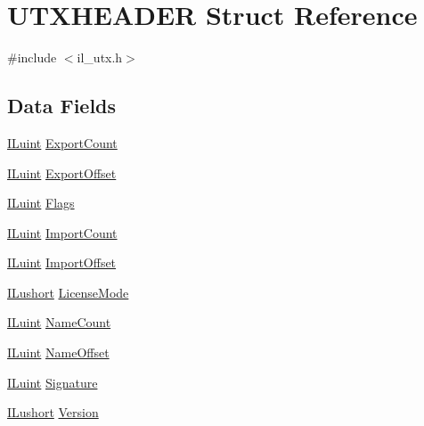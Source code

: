 \hypertarget{struct_u_t_x_h_e_a_d_e_r}{\section{U\-T\-X\-H\-E\-A\-D\-E\-R Struct Reference}
\label{struct_u_t_x_h_e_a_d_e_r}
}


{\ttfamily \#include $<$il\-\_\-utx.\-h$>$}

\subsection*{Data Fields}
\begin{DoxyCompactItemize}
\item 
\hyperlink{il_8h_ac6508d0e9c19e32f32e00d54b5b8cf30}{I\-Luint} \hyperlink{struct_u_t_x_h_e_a_d_e_r_a56bad17a7beb0fa9e47c24a14918b081}{Export\-Count}
\item 
\hyperlink{il_8h_ac6508d0e9c19e32f32e00d54b5b8cf30}{I\-Luint} \hyperlink{struct_u_t_x_h_e_a_d_e_r_a6ef7e5972b307fd0f4171030bd6e347d}{Export\-Offset}
\item 
\hyperlink{il_8h_ac6508d0e9c19e32f32e00d54b5b8cf30}{I\-Luint} \hyperlink{struct_u_t_x_h_e_a_d_e_r_ad5c4db01d6ffdff05862b7052afa79fc}{Flags}
\item 
\hyperlink{il_8h_ac6508d0e9c19e32f32e00d54b5b8cf30}{I\-Luint} \hyperlink{struct_u_t_x_h_e_a_d_e_r_a3ff4d4de7483624fe959dda4368c4799}{Import\-Count}
\item 
\hyperlink{il_8h_ac6508d0e9c19e32f32e00d54b5b8cf30}{I\-Luint} \hyperlink{struct_u_t_x_h_e_a_d_e_r_a5fde61a0df916fc2c76216f31ca3ef2a}{Import\-Offset}
\item 
\hyperlink{il_8h_af6287b43748354a7c4864da43ae56962}{I\-Lushort} \hyperlink{struct_u_t_x_h_e_a_d_e_r_a96213c0c7f0c9d41d026a75bb1fc65cf}{License\-Mode}
\item 
\hyperlink{il_8h_ac6508d0e9c19e32f32e00d54b5b8cf30}{I\-Luint} \hyperlink{struct_u_t_x_h_e_a_d_e_r_af2ca7fab3e564d18e72ba7620d125dc6}{Name\-Count}
\item 
\hyperlink{il_8h_ac6508d0e9c19e32f32e00d54b5b8cf30}{I\-Luint} \hyperlink{struct_u_t_x_h_e_a_d_e_r_a68070734d575788cdf666da6ac1e8187}{Name\-Offset}
\item 
\hyperlink{il_8h_ac6508d0e9c19e32f32e00d54b5b8cf30}{I\-Luint} \hyperlink{struct_u_t_x_h_e_a_d_e_r_a41fa9091b239c168dd116f1c2cd99256}{Signature}
\item 
\hyperlink{il_8h_af6287b43748354a7c4864da43ae56962}{I\-Lushort} \hyperlink{struct_u_t_x_h_e_a_d_e_r_a3824b470c86baa88d6ac31a3719e9f9a}{Version}
\end{DoxyCompactItemize}


